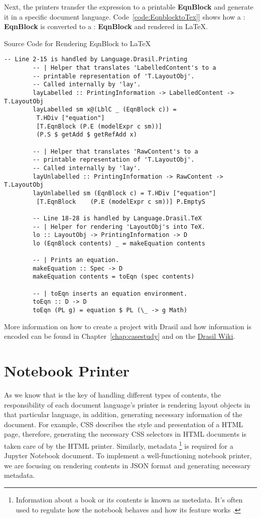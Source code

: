 Next, the printers transfer the expression to a printable \textbf{EqnBlock} and 
generate it in a specific document language. Code~\ref{code:EqnblocktoTex]} 
shows how a : \textbf{EqnBlock} is converted to a 
: \textbf{EqnBlock} and rendered in LaTeX.

\begin{listing}
	\caption{Source Code for Rendering EqnBlock to LaTeX}
	\label{code:EqnblocktoTex]}
	\begin{lstlisting}[language=haskell1]
		-- Line 2-15 is handled by Language.Drasil.Printing
		-- | Helper that translates 'LabelledContent's to a 
		-- printable representation of 'T.LayoutObj'. 
		-- Called internally by 'lay'.
		layLabelled :: PrintingInformation -> LabelledContent -> T.LayoutObj
		layLabelled sm x@(LblC _ (EqnBlock c)) = 
		 T.HDiv ["equation"] 
		 [T.EqnBlock (P.E (modelExpr c sm))]
		 (P.S $ getAdd $ getRefAdd x)
		
		-- | Helper that translates 'RawContent's to a  
		-- printable representation of 'T.LayoutObj'. 
		-- Called internally by 'lay'.
		layUnlabelled :: PrintingInformation -> RawContent -> T.LayoutObj
		layUnlabelled sm (EqnBlock c) = T.HDiv ["equation"] 
		 [T.EqnBlock	(P.E (modelExpr c sm))] P.EmptyS
		
		-- Line 18-28 is handled by Language.Drasil.TeX
		-- | Helper for rendering 'LayoutObj's into TeX.
		lo :: LayoutObj -> PrintingInformation -> D
		lo (EqnBlock contents) _ = makeEquation contents
		
		-- | Prints an equation.
		makeEquation :: Spec -> D
		makeEquation contents = toEqn (spec contents)
		
		-- | toEqn inserts an equation environment.
		toEqn :: D -> D
		toEqn (PL g) = equation $ PL (\_ -> g Math)
	\end{lstlisting}
\end{listing}

More information on how to create a project with Drasil and how information is 
encoded can be found in Chapter~\ref{chap:casestudy} and on the 
\href{https://jacquescarette.github.io/Drasil/}{Drasil Wiki}. 

\section{Notebook Printer}
As we know that  is the key of handling different types of 
contents, the responsibility of each document language's printer is rendering 
layout objects in that particular language, in addition, generating necessary 
information of the document. For example, CSS describes the style and 
presentation of a HTML page, therefore, generating the necessary CSS 
selectors in HTML documents is taken care of by the HTML printer. Similarly, 
metadata \footnote{Information about a 
book or its contents is known as metedata. It's often used to regulate how the 
notebook behaves and how its feature works \cite{notebookmetadata}.} is 
required for a Jupyter Notebook document. To implement a well-functioning 
notebook printer, we are focusing on rendering contents in JSON format and 
generating necessary metadata.

